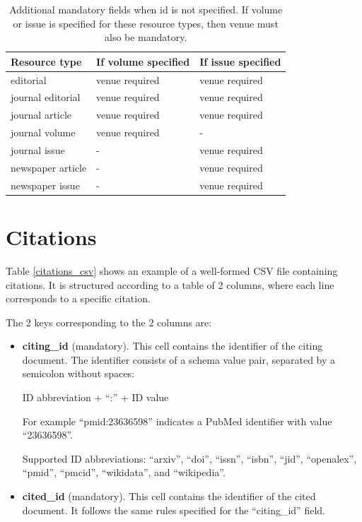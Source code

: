 \documentclass{article}
\begin{document}
\begin{table}[!htb]
\centering
\caption{Additional mandatory fields when id is not specified. If volume or issue is specified for these resource types, then venue must also be mandatory.}
\label{mandatory_fields_no_id}
\begin{tabular}{lll}
\hline
\textbf{Resource type} & \textbf{If volume specified} & \textbf{If issue specified} \\ \hline
editorial & venue required & venue required \\ \hline
journal editorial & venue required & venue required \\ \hline
journal article & venue required & venue required \\ \hline
journal volume & venue required & - \\ \hline
journal issue & - & venue required \\ \hline
newspaper article & - & venue required \\ \hline
newspaper issue & - & venue required \\ \hline
\end{tabular}
\end{table}

\section{Citations}\label{s_citations}

Table \ref{citations_csv} shows an example of a well-formed CSV file containing citations. It is structured according to a table of 2 columns, where each line corresponds to a specific citation.

The 2 keys corresponding to the 2 columns are:

\begin{itemize}
    \item \textbf{citing\_id} (mandatory). This cell contains the identifier of the citing document. The identifier consists of a schema value pair, separated by a semicolon without spaces:
        \begin{center}ID abbreviation + ``:'' + ID value\end{center}
    For example ``pmid:23636598'' indicates a PubMed identifier with value ``23636598''.

  Supported ID abbreviations: ``arxiv'', ``doi'', ``issn'', ``isbn'', ``jid'', ``openalex'', ``pmid'', ``pmcid'', ``wikidata'', and ``wikipedia''.
    \item \textbf{cited\_id} (mandatory). This cell contains the identifier of the cited document. It follows the same rules specified for the ``citing\_id'' field.
\end{itemize}
\end{document}
